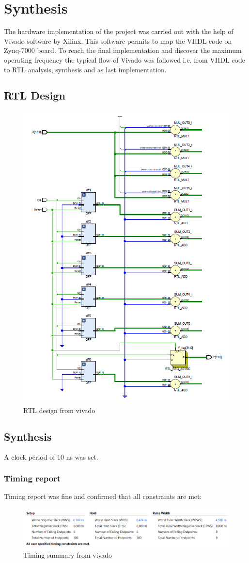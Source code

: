 \section{Synthesis} %
The hardware implementation of the project was carried out with the help of Vivado software by Xilinx. This software permits to map the VHDL code on Zynq-7000 board. To reach the final implementation and discover the maximum operating frequency the typical flow of Vivado was followed i.e. from VHDL code to RTL analysis, synthesis and as last implementation.
\label{sec:synthesis_and_implementation}
\subsection{RTL Design}
\begin{figure}[H]
  \centering
  \includegraphics[width=0.7\linewidth]{./images/schematic.PNG}
  \caption{RTL design from vivado}
  \label{fig:schematic}
\end{figure}
\clearpage
\subsection{Synthesis}
A clock period of 10 ns was set.

\subsubsection{Timing report} %
\label{ssub:timing_report}
Timing report was fine and confirmed that all constraints are met:
\begin{figure}[H]
  \centering
  \includegraphics[width=0.9\linewidth]{./images/timing.PNG}
  \caption{Timing summary from vivado}
  \label{fig:timing}
\end{figure}


